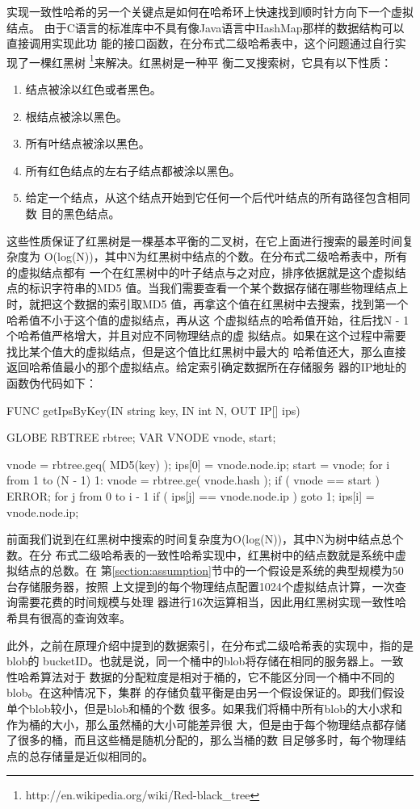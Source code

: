 实现一致性哈希的另一个关键点是如何在哈希环上快速找到顺时针方向下一个虚拟结点。
由于C语言的标准库中不具有像Java语言中HashMap那样的数据结构可以直接调用实现此功
能的接口函数，在分布式二级哈希表中，这个问题通过自行实现了一棵红黑树
\footnote{http://en.wikipedia.org/wiki/Red-black\_tree}来解决。红黑树是一种平
衡二叉搜索树，它具有以下性质：
\begin{enumerate}
  \item 结点被涂以红色或者黑色。
  \item 根结点被涂以黑色。
  \item 所有叶结点被涂以黑色。
  \item 所有红色结点的左右子结点都被涂以黑色。
  \item 给定一个结点，从这个结点开始到它任何一个后代叶结点的所有路径包含相同数
  目的黑色结点。
\end{enumerate}
这些性质保证了红黑树是一棵基本平衡的二叉树，在它上面进行搜索的最差时间复杂度为
O(log(N))，其中N为红黑树中结点的个数。在分布式二级哈希表中，所有的虚拟结点都有
一个在红黑树中的叶子结点与之对应，排序依据就是这个虚拟结点的标识字符串的MD5
值。当我们需要查看一个某个数据存储在哪些物理结点上时，就把这个数据的索引取MD5
值，再拿这个值在红黑树中去搜索，找到第一个哈希值不小于这个值的虚拟结点，再从这
个虚拟结点的哈希值开始，往后找N - 1个哈希值严格增大，并且对应不同物理结点的虚
拟结点。如果在这个过程中需要找比某个值大的虚拟结点，但是这个值比红黑树中最大的
哈希值还大，那么直接返回哈希值最小的那个虚拟结点。给定索引确定数据所在存储服务
器的IP地址的函数伪代码如下：
\begin{code}
  FUNC getIpsByKey(IN string key, IN int N, OUT IP[] ips)
  {
    GLOBE RBTREE rbtree;
    VAR VNODE vnode, start;

    vnode = rbtree.geq( MD5(key) );
    ips[0] = vnode.node.ip;
    start = vnode;
    for i from 1 to (N - 1)
    {
1:    vnode = rbtree.ge( vnode.hash );
      if ( vnode == start ) ERROR;
      for j from 0 to i - 1
      {
        if ( ips[j] == vnode.node.ip ) goto 1;
      }
      ips[i] = vnode.node.ip;
    }
  }
\end{code}
前面我们说到在红黑树中搜索的时间复杂度为O(log(N))，其中N为树中结点总个数。在分
布式二级哈希表的一致性哈希实现中，红黑树中的结点数就是系统中虚拟结点的总数。在
第\ref{section:assumption}节中的一个假设是系统的典型规模为50台存储服务器，按照
上文提到的每个物理结点配置1024个虚拟结点计算，一次查询需要花费的时间规模与处理
器进行16次运算相当，因此用红黑树实现一致性哈希具有很高的查询效率。

此外，之前在原理介绍中提到的数据索引，在分布式二级哈希表的实现中，指的是blob的
bucketID。也就是说，同一个桶中的blob将存储在相同的服务器上。一致性哈希算法对于
数据的分配粒度是相对于桶的，它不能区分同一个桶中不同的blob。在这种情况下，集群
的存储负载平衡是由另一个假设保证的。即我们假设单个blob较小，但是blob和桶的个数
很多。如果我们将桶中所有blob的大小求和作为桶的大小，那么虽然桶的大小可能差异很
大，但是由于每个物理结点都存储了很多的桶，而且这些桶是随机分配的，那么当桶的数
目足够多时，每个物理结点的总存储量是近似相同的。


